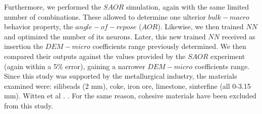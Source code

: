Furthermore, we performed the $SAOR$ simulation, again with the same limited number of combinations.
These allowed to determine one ulterior $bulk-macro$ behavior property, the
$angle-of-repose$ ($AOR$).
Likewise, we then trained $NN$ and optimized the number of its neurons.
Later, this new trained $NN$ received as insertion the $DEM-micro$ coefficients
range previously determined.
We then compared their outputs against the values provided by the $SAOR$ experiment (again within a 5\% error), gaining a narrower $DEM-micro$ coefficients range.
Since this study was supported by the metallurgical industry, the materials
examined were: silibeads (2 mm), coke, iron ore, limestone, sinterfine (all
0-3.15 mm).
Witten et al . \cite{RefWorks:174}.
For the same reason, cohesive materials have been excluded from this study.\\ \label{par:materials}